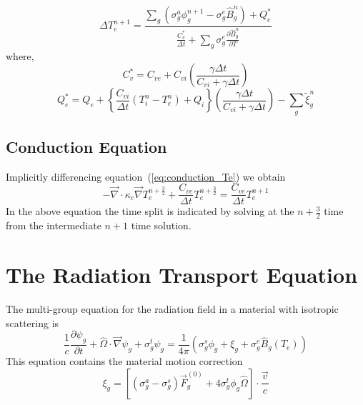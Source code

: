 \documentclass{article}
\newcommand{\partl}[2]{\ensuremath{\frac{\partial{#1}}{\partial{#2}}}}\newcommand{\del}{\ensuremath{\vec{\nabla}}}
\newcommand{\dt}{\ensuremath{\Delta t}}
\newcommand{\cviOdt}{\ensuremath{\frac{C_{vi}}{\dt}}}
\newcommand{\Cvs}{\ensuremath{C_{v}^{*}}}
\newcommand{\cvsOdt}{\ensuremath{\frac{\Cvs}{\dt}}}
\newcommand{\Bg}{\ensuremath{\hat{B}_{g}}}
\newcommand{\Bgn}{\ensuremath{\hat{B}_{g}^{n}}}
\newcommand{\pBgndT}{\ensuremath{\frac{\partial\Bgn}{\partial T}}}
\begin{document}
\begin{equation}
   \boxed{
	\Delta T_{e}^{n+1} =
		\frac{\sum_{g} \left( \sigma_{g}^{a} \phi_{g}^{n+1} 
			 - \sigma_{g}^{e} \Bgn \right)
			 + Q_{e}^{*}}
		{\cvsOdt + \sum_{g} \sigma_{g}^{e} \pBgndT}
         }
\label{eq:Tenp1}
\end{equation}
where,
\begin{equation}
	\Cvs = C_{ve} + C_{vi} \left(\frac{\gamma\dt}{C_{vi}+\gamma\dt}\right)
\end{equation}
\begin{equation}
	Q_{e}^{*} = Q_{e} + \left\{ \cviOdt (T_{i}^{n} - T_{e}^{n}) +
				Q_{i} \right\}
		\left(\frac{\gamma\dt}{C_{vi}+\gamma\dt}\right) -
		\sum_{g} \tilde{\xi}_{g}^{n}
\end{equation}

\subsection{Conduction Equation}

Implicitly differencing equation~(\ref{eq:conduction_Te})
we obtain
\begin{equation}
  \boxed{
     - \del \cdot \kappa_{e} \del T^{n+\frac{3}{2}}_{e}
     + \frac{C_{ve}}{\Delta t} T^{n+\frac{3}{2}}_{e}
	   = \frac{C_{ve}}{\Delta t} T^{n+1}_{e}
   }
\label{eq:conduction_Te_tdiff}	
\end{equation}
In the above equation the time split is indicated by solving at the
$n+\frac{3}{2}$ time from the intermediate $n+1$ time solution.

\section{The Radiation Transport Equation}

The multi-group equation for the radiation field in a material
with isotropic scattering is
\begin{equation}
	\frac{1}{c} \partl{\psi_{g}}{t}
	+ \hat{\Omega} \cdot \del \psi_{g}
	+ \sigma^{t}_{g} \psi_{g}
	= \frac{1}{4 \pi}
	 \left( \sigma^{s}_{g} \phi_{g}
		+ \xi_{g}
		+ \sigma^{e}_{g} \Bg(T_{e})
         \right)
\label{eq:psi}
\end{equation}
This equation contains the material motion correction
\begin{equation}
	\xi_{g} = \left[ (\sigma^{a}_{g} - \sigma^{s}_{g}) \vec{F}^{(0)}_{g}
		+ 4 \sigma^{t}_{g} \phi_{g} \hat{\Omega} \right]
			\cdot \frac{\vec{v}}{c}
\label{eq:xi}
\end{equation}
\end{document}
